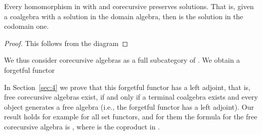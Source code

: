 \documentclass{LMCS}
\theoremstyle{plain}
\theoremstyle{definition}
\numberwithin{equation}{section}
\begin{document}
\begin{lem}\label{homos are solution prese}
Every homomorphism  in  with  and  corecursive preserves solutions. That is,  given a coalgebra  with a solution  in the domain algebra, then  is the solution in the codomain one.
\end{lem}

\begin{proof}
This follows from the diagram

\end{proof}


\noindent We thus consider corecursive algebras as a full subcategory  of . We obtain a forgetful functor


In Section~\ref{sec:4} we prove that this forgetful functor has a left adjoint, that is, free corecursive algebras exist, if and only if a terminal coalgebra  exists and every object  generates a free algebra  (i.e., the forgetful functor  has a left adjoint). Our result holds for example for all set functors, and for them the formula for the free corecursive algebra is , where  is the coproduct in .
\end{document}
